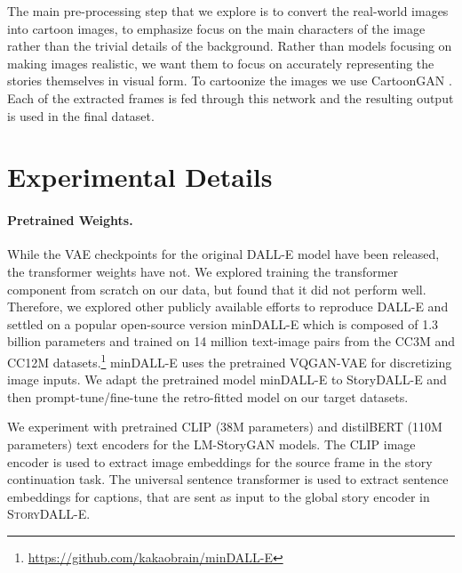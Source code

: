 \documentclass[runningheads]{llncs}
\newcommand{\sdalle}[1]{\textsc{StoryDALL-E}}
\begin{document}
The main pre-processing step that we explore is to convert the real-world images into cartoon images, to emphasize focus on the main characters of the image rather than the trivial details of the background. Rather than models focusing on making images realistic, we want them to focus on accurately representing the stories themselves in visual form. To cartoonize the images we use CartoonGAN \cite{chen2018cartoongan}. Each of the extracted frames is fed through this network and the resulting output is used in the final dataset.


\section{Experimental Details}
\paragraph{Pretrained Weights.}
While the VAE checkpoints for the original DALL-E model have been released, the transformer weights have not. We explored training the transformer component from scratch on our data, but found that it did not perform well. Therefore, we explored other publicly available efforts to reproduce DALL-E and settled on a popular open-source version minDALL-E which is composed of 1.3 billion parameters and trained on 14 million text-image pairs from the CC3M \cite{sharma2018conceptual} and CC12M \cite{changpinyo2021conceptual} datasets.\footnote{\url{https://github.com/kakaobrain/minDALL-E}}
minDALL-E uses the pretrained VQGAN-VAE \cite{esser2021taming} for discretizing image inputs. We adapt the pretrained model minDALL-E to StoryDALL-E and then prompt-tune/fine-tune the retro-fitted model on our target datasets.

We experiment with pretrained CLIP \cite{radford2021learning} (38M parameters) and distilBERT \cite{sanh2019distil} (110M parameters) text encoders for the LM-StoryGAN models. The CLIP image encoder is used to extract image embeddings for the source frame in the story continuation task. The universal sentence transformer \cite{cer2018universal} is used to extract sentence embeddings for captions, that are sent as input to the global story encoder in \sdalle{}.
\end{document}
